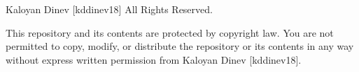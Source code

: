 Kaloyan Dinev \mbox{[}kddinev18\mbox{]} All Rights Reserved.

This repository and its contents are protected by copyright law. You are not permitted to copy, modify, or distribute the repository or its contents in any way without express written permission from Kaloyan Dinev \mbox{[}kddinev18\mbox{]}. 